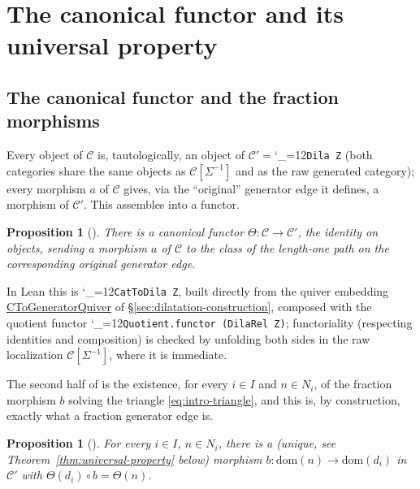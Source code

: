 \documentclass[11pt]{amsart}
\newcommand{\lc}[1]{\url{#1}}
\newcommand{\lcode}{\begingroup\catcode`\_=12\relax\lcodeInner}
\newcommand{\lcodeInner}[1]{\texttt{#1}\endgroup}
\theoremstyle{plain}
\newtheorem{proposition}[theorem]{Proposition}
\theoremstyle{definition}
\theoremstyle{remark}
\newcommand{\calC}{\mathcal C}
\newcommand{\dom}{\mathrm{dom}}
\begin{document}
\section{The canonical functor and its universal property}
\label{sec:universal-property}

\subsection{The canonical functor and the fraction morphisms}
\label{sec:theta-properties}

Every object of $\calC$ is, tautologically, an object of $\calC' = $\lcode{Dila Z} (both
categories share the same objects as $\calC[\Sigma^{-1}]$ and as the raw generated category);
every morphism $a$ of $\calC$ gives, via the ``original'' generator edge it defines, a
morphism of $\calC'$. This assembles into a functor.

\begin{proposition}[{\citep[Proposition~3.1(i)]{Mayeux}}]
There is a canonical functor $\Theta : \calC \to \calC'$, the identity on objects, sending a
morphism $a$ of $\calC$ to the class of the length-one path on the corresponding original
generator edge.
\end{proposition}

In Lean this is \lcode{CatToDila Z}, built directly from the quiver embedding
\lc{CToGeneratorQuiver} of \S\ref{sec:dilatation-construction}, composed with the quotient
functor \lcode{Quotient.functor (DilaRel Z)}; functoriality (respecting identities and
composition) is checked by unfolding both sides in the raw localization
$\calC[\Sigma^{-1}]$, where it is immediate.

The second half of \citep[Proposition~3.1]{Mayeux} is the existence, for every $i \in I$ and $n \in N_i$, of
the fraction morphism $b$ solving the triangle \eqref{eq:intro-triangle}, and this is, by
construction, exactly what a fraction generator edge is.

\begin{proposition}[{\citep[Proposition~3.1(ii)]{Mayeux}}]
\label{prop:fraction-exists}
For every $i \in I$, $n \in N_i$, there is a (unique, see
Theorem~\ref{thm:universal-property} below) morphism $b : \dom(n) \to \dom(d_i)$ in $\calC'$
with $\Theta(d_i) \circ b = \Theta(n)$.
\end{proposition}
\end{document}
